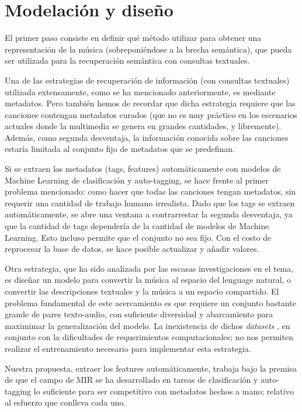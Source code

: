 \section{Modelación y diseño}
\label{sec:design}
El primer paso consiste en definir qué método utilizar para obtener una representación de la música (sobreponiéndose a la brecha semántica), que pueda ser utilizada para la recuperación semántica con consultas textuales.

Una de las estrategias de recuperación de información (con consultas textuales) utilizada extensamente, como se ha mencionado anteriormente, es mediante metadatos. Pero también hemos de recordar que dicha estrategia requiere que las canciones contengan metadatos curados (que no es muy práctico en los escenarios actuales donde la multimedia se genera en grandes cantidades, y libremente). Además, como segunda desventaja, la información conocida sobre las canciones estaría limitada al conjunto fijo de metadatos que se predefinan. 

Si se extraen los metadatos (tags, features) automáticamente con modelos de Machine Learning de clasificación y auto-tagging, se hace frente al primer problema mencionado: como hacer que todas las canciones tengan metadatos, sin requerir una cantidad de trabajo humano irrealista. Dado que los tags se extraen automáticamente, se abre una ventana a contrarrestar la segunda desventaja, ya que la cantidad de tags dependería de la cantidad de modelos de Machine Learning. Esto incluso permite que el conjunto no sea fijo. Con el costo de reprocesar la base de datos, se hace posible actualizar y añadir valores.

Otra estrategia, que ha sido analizada por las escasas investigaciones en el tema, es diseñar un modelo para convertir la música al espacio del lenguage natural, o convertir las descripciones textuales y la música a un espacio compartido. El problema fundamental de este acercamiento es que requiere un conjunto bastante grande de pares texto-audio, con suficiente diversidad y abarcamiento para maximimar la generalización del modelo. La inexistencia de dichos \textit{datasets} \cite{Simonetta2019MultimodalMI, Huang2022MuLanAJ, Manco2022ContrastiveAL}, en conjunto con la dificultades de requerimientos computacionales; no nos permiten realizar el entrenamiento necesario para implementar esta estrategia. 

Nuestra propuesta, extraer los features automáticamente, trabaja bajo la premisa de que el campo de MIR se ha desarrollado en tareas de clasificación y auto-tagging lo suficiente para ser competitivo con metadatos hechos a mano; relativo al esfuerzo que conlleva cada uno. %


